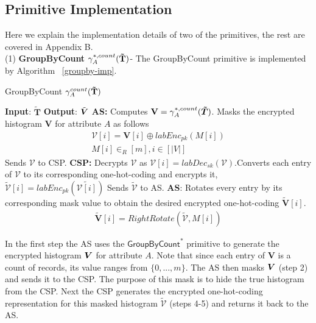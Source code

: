 \subsection{Primitive Implementation}
Here we explain the implementation details of two of the  \system primitives, the rest are covered in Appendix  B.\\ (1)\textbf{ \textsf{GroupByCount }}$\gamma^{*,count}_A(\mathbf{\tilde{T}})$- The \textsf{GroupByCount} primitive is implemented by Algorithm ~\ref{groupby-imp}. \begin{algorithm}
\small
\caption{\textsf{GroupByCount }$\gamma^{count}_A(\mathbf{\tilde{T}})$}
\begin{algorithmic}[1]
\STATEx
\textbf{Input}: $\mathbf{\tilde{T}}$
\STATEx \textbf{Output}: $\tilde{\boldsymbol{V}}$
\STATEx \textbf{\textsf{AS}:} \STATE Computes $\mathbf{V}=\gamma^{*,count}_{A}(\boldsymbol{\tilde{T}})$.
\STATE Masks the encrypted histogram $\mathbf{V}$ for attribute $A$ as follows \begin{gather*}\boldsymbol{\mathcal{V}}[i]= \mathbf{V}[i] \oplus labEnc_{pk}(M[i])\\M[i] \in_R [m], i \in [|V|]\end{gather*}
\STATE Sends $\boldsymbol{\mathcal{V}}$ to \textsf{CSP}.
\STATEx \textbf{\textsf{CSP}:}
\STATE Decrypts  $\boldsymbol{\mathcal{V}}$ as $\mathcal{V}[i]=labDec_{sk}(\boldsymbol{\mathcal{V}})$.\STATE Converts each entry of $\mathcal{V}$ to its corresponding one-hot-coding and encrypts it, $\boldsymbol{\tilde{\mathcal{V}}}[i]=labEnc_{pk}(\tilde{\mathcal{V}[i]})$
\STATE Sends $\boldsymbol{\tilde{\mathcal{V}}}$ to \textsf{AS}.
\STATEx \textbf{\textsf{AS}}:
\STATE  Rotates every entry by its corresponding mask value to obtain the desired  encrypted one-hot-coding $\boldsymbol{\tilde{V}}[i]$. \begin{gather*}\boldsymbol{\tilde{V}}[i]=RightRotate(\boldsymbol{\tilde{\mathcal{V}}},M[i])\end{gather*} 
 \end{algorithmic} \label{groupby-imp}
\end{algorithm} 
In the first step the \textsf{AS} uses the $\textsf{GroupByCount}^*$ primitive to generate the encrypted histogram $\boldsymbol{V}$ for attribute $A$. Note that since each entry of $\mathbf{V}$ is a count of records, its value ranges from $\{0,...,m\}$. The \textsf{AS} then masks $\boldsymbol{V}$ (step 2) and sends it to the \textsf{CSP}. The purpose of this mask is to hide the true histogram from the \textsf{CSP}. Next the \textsf{CSP} generates the encrypted one-hot-coding representation for this masked histogram $\boldsymbol{\tilde{\mathcal{V}}}$ (steps 4-5) and returns it back to the \textsf{AS}. %
